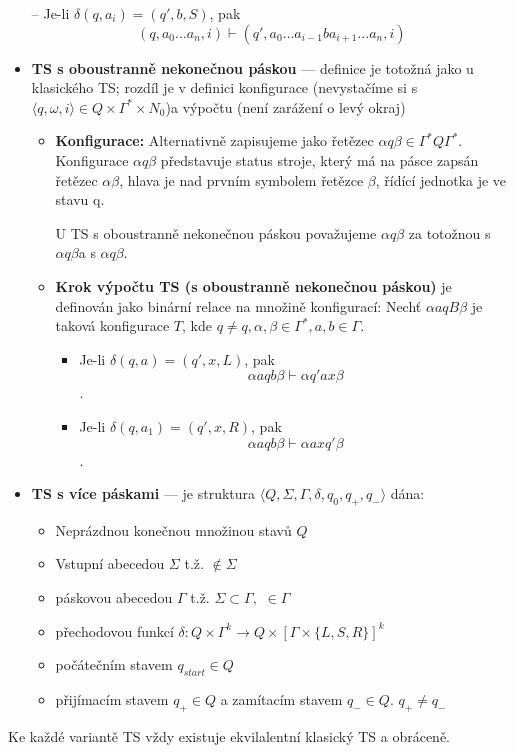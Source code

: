 \documentclass[10pt,a4paper]{article}
\begin{document}
\begin{itemize}
				-- Je-li $\delta(q, a_{i}) = (q', b, S)$, pak 
					$$(q,a_{0} \dots a_{n}, i) \vdash (q', a_{0} \dots a_{i-1}ba_{i+1} \dots a_{n},i) $$
			\item \textbf{TS s oboustranně nekonečnou páskou} --- definice je totožná jako u klasického TS; rozdíl je v definici
			 konfigurace (nevystačíme si s $\langle q, \omega, i \rangle \in Q \times \Gamma^{*} \times N_{0}$)a výpočtu
			(není zarážení o levý okraj)
				\begin{itemize}
					\item \textbf{Konfigurace:} Alternativně zapisujeme jako řetězec
					 	$\alpha q\beta \in \Gamma^{*}Q\Gamma^{*}.$ 
						Konfigurace $\alpha q\beta$ představuje status stroje, který má na pásce zapsán řetězec
						$ \alpha\beta$,
						hlava	je nad prvním symbolem řetězce $\beta$, řídící jednotka je ve stavu q.

						U TS s oboustranně nekonečnou páskou považujeme $\alpha q\beta$ za totožnou s  
						$\alpha q\beta$\textvisiblespace a s \textvisiblespace$\alpha q\beta$.
					\item \textbf{Krok výpočtu TS (s oboustranně nekonečnou páskou)} je definován jako binární 
						relace na množině konfigurací: Nechť $\alpha aqB\beta$ je taková konfigurace $T$, kde 
						$q \neq q, \alpha, \beta \in \Gamma^{*}, a,b \in \Gamma.$
						\begin{itemize}
							\item Je-li $\delta(q,a) = (q', x, L) $, pak  $$\alpha aqb\beta \vdash \alpha q'ax\beta$$.
							\item Je-li $\delta(q,a_{1}) = (q', x, R) $, pak 
									$$\alpha aqb\beta \vdash \alpha axq'\beta$$.
						\end{itemize}
				\end{itemize}
					\item \textbf{TS s více páskami} --- je struktura $\langle Q, \Sigma, \Gamma, \delta, q_{0}, q_{+}, 
						q_{-} \rangle $ dána:
						\begin{itemize}
							\item Neprázdnou konečnou množinou stavů $Q$
							\item Vstupní abecedou  $\Sigma$ t.ž. \textvisiblespace $ \notin \Sigma$
							\item páskovou abecedou $\Gamma$ t.ž. $\Sigma \subset \Gamma,$ \textvisiblespace 
								$\in  \Gamma $
							\item přechodovou funkcí $\delta : Q \times  \Gamma^{k} \rightarrow Q \times [ \Gamma 
								\times \{L, S, R \} ]^{k}$
							\item počátečním stavem $q_{start} \in Q$
							\item přijímacím stavem $q_{+} \in Q $ a zamítacím stavem $q_{-} 
								\in Q.$ $q_{+} \neq q_{-}$
						\end{itemize}		
			
		\end{itemize}
		Ke každé variantě TS vždy existuje ekvilalentní klasický TS a obráceně.
\end{document}
